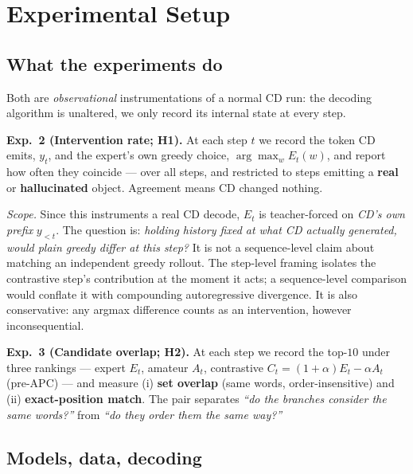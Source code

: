 \documentclass{article}
\begin{document}

\section{Experimental Setup}
\label{sec:cdmech-setup}

\subsection{What the experiments do}
\label{subsec:cdmech-what}

Both are \emph{observational} instrumentations of a normal CD run: the decoding
algorithm is unaltered, we only record its internal state at every step.

\textbf{Exp.~2 (Intervention rate; H1).} At each step $t$ we record the token CD
emits, $y_t$, and the expert's own greedy choice, $\arg\max_w E_t(w)$, and
report how often they coincide --- over all steps, and restricted to steps
emitting a \textbf{real} or \textbf{hallucinated} object. Agreement means CD
changed nothing.

\emph{Scope.} Since this instruments a real CD decode, $E_t$ is teacher-forced
on \emph{CD's own prefix} $y_{<t}$. The question is: \emph{holding history fixed
at what CD actually generated, would plain greedy differ at this step?} It is
not a sequence-level claim about matching an independent greedy rollout. The
step-level framing isolates the contrastive step's contribution at the moment it
acts; a sequence-level comparison would conflate it with compounding
autoregressive divergence. It is also conservative: any argmax difference counts
as an intervention, however inconsequential.

\textbf{Exp.~3 (Candidate overlap; H2).} At each step we record the top-$10$
under three rankings --- expert $E_t$, amateur $A_t$, contrastive
$C_t=(1{+}\alpha)E_t-\alpha A_t$ (pre-APC) --- and measure (i) \textbf{set
overlap} (same words, order-insensitive) and (ii) \textbf{exact-position match}.
The pair separates \emph{``do the branches consider the same words?''} from
\emph{``do they order them the same way?''}

\subsection{Models, data, decoding}
\label{subsec:cdmech-models}
\end{document}
